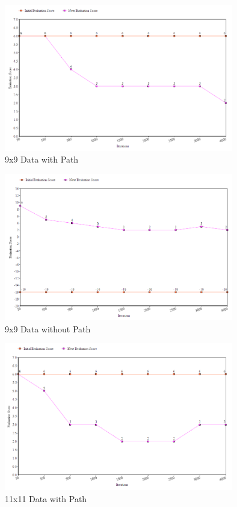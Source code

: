 \documentclass[11pt, oneside]{article}   	%
\begin{document}
\begin{figure}[H]
\centering
\includegraphics[width=100mm]{9x9Path.png}
\caption{9x9 Data with Path}
\label{fig:method}
\end{figure}

\begin{figure}[H]
\centering
\includegraphics[width=100mm]{9x9noPath.png}
\caption{9x9 Data without Path}
\label{fig:method}
\end{figure}

\begin{figure}[H]
\centering
\includegraphics[width=100mm]{11x11Path.png}
\caption{11x11 Data with Path}
\label{fig:method}
\end{figure}
\end{document}
